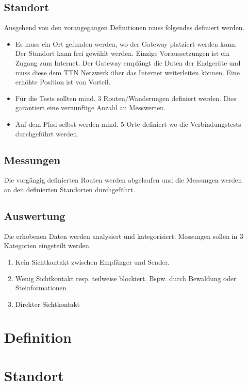 \documentclass[11pt,english,german]{report}
\theoremstyle{definition}
\begin{document}
\newpage
\subsection{Standort}
Ausgehend von den vorangegangen Definitionen muss folgendes definiert werden.
\begin{itemize}
	\item Es muss ein Ort gefunden werden, wo der Gateway platziert werden kann.\\[0.3cm]
	Der Standort kann frei gewählt werden. Einzige Voraussetzungen ist ein Zugang zum Internet. Der Gateway empfängt die Daten der Endgeräte und muss diese dem TTN Netzwerk über das Internet weiterleiten können. Eine erhöhte Position ist von Vorteil.
	\item Für die Tests sollten mind. 3 Routen/Wanderungen definiert werden. Dies garantiert eine vernünftige Anzahl an Messwerten.
	\item Auf dem Pfad selbst werden mind. 5 Orte definiert wo die Verbindungstests durchgeführt werden.
\end{itemize}

\subsection{Messungen}
Die vorgängig definierten Routen werden abgelaufen und die Messungen werden an den definierten Standorten durchgeführt.

\subsection{Auswertung}
Die erhobenen Daten werden analysiert und kategorisiert. Messungen sollen in 3 Kategorien eingeteilt werden.
\begin{enumerate}
	\item Kein Sichtkontakt zwischen Empfänger und Sender.
	\item Wenig Sichtkontakt resp. teilweise blockiert. Bspw. durch Bewaldung oder Steinformationen
	\item Direkter Sichtkontakt
\end{enumerate}

\newpage
\section{Definition}

\section{Standort}
\end{document}
